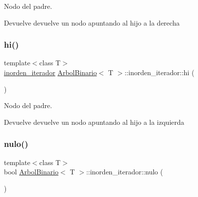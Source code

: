 Nodo del padre. 

\begin{DoxyReturn}{Devuelve}
devuelve un nodo apuntando al hijo a la derecha 
\end{DoxyReturn}
\mbox{\label{classArbolBinario_1_1inorden__iterador_a37fae9f00d9a8ac43ddd0a36ad5873c4}} 
\subsubsection{\texorpdfstring{hi()}{hi()}}
{\footnotesize\ttfamily template$<$class T$>$ \\
\hyperlink{classArbolBinario_1_1inorden__iterador}{inorden\+\_\+iterador} \hyperlink{classArbolBinario}{Arbol\+Binario}$<$ T $>$\+::inorden\+\_\+iterador\+::hi (\begin{DoxyParamCaption}{ }\end{DoxyParamCaption})\hspace{0.3cm}{\ttfamily [inline]}}



Nodo del padre. 

\begin{DoxyReturn}{Devuelve}
devuelve un nodo apuntando al hijo a la izquierda 
\end{DoxyReturn}
\mbox{\label{classArbolBinario_1_1inorden__iterador_afcd755553d0a646627a39d4b44ee2897}} 
\subsubsection{\texorpdfstring{nulo()}{nulo()}}
{\footnotesize\ttfamily template$<$class T$>$ \\
bool \hyperlink{classArbolBinario}{Arbol\+Binario}$<$ T $>$\+::inorden\+\_\+iterador\+::nulo (\begin{DoxyParamCaption}{ }\end{DoxyParamCaption})\hspace{0.3cm}{\ttfamily [inline]}}



